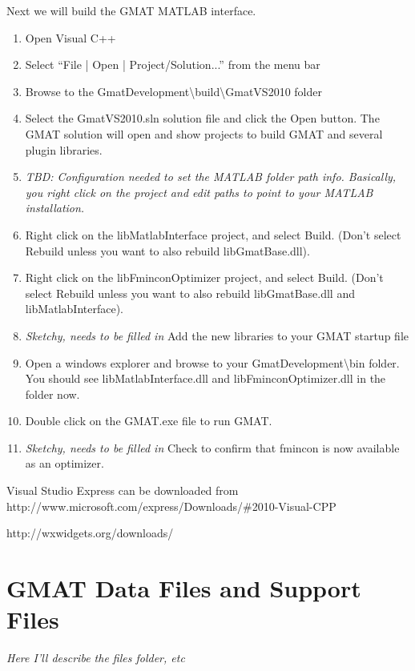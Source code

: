 \documentclass[letterpaper,10pt]{article}%
\begin{document}
Next we will build the GMAT MATLAB interface.

\begin{enumerate}
\item Open Visual C++
\item Select ``File | Open | Project/Solution...'' from the menu bar
\item Browse to the GmatDevelopment\textbackslash build\textbackslash GmatVS2010 folder
\item Select the GmatVS2010.sln solution file and click the Open button.  The GMAT solution will open and show projects to build GMAT and several plugin libraries.
\item \textit{TBD: Configuration needed to set the MATLAB folder path info.  Basically, you right click on the project and edit paths to point to your MATLAB installation.}
\item Right click on the libMatlabInterface project, and select Build.  (Don't select Rebuild unless you want to also rebuild libGmatBase.dll).
\item Right click on the libFminconOptimizer project, and select Build.  (Don't select Rebuild unless you want to also rebuild libGmatBase.dll and libMatlabInterface).
\item \textit{Sketchy, needs to be filled in} Add the new libraries to your GMAT startup file
\item Open a windows explorer and browse to your GmatDevelopment\textbackslash bin folder.  You should see libMatlabInterface.dll and libFminconOptimizer.dll in the folder now.
\item Double click on the GMAT.exe file to run GMAT.
\item \textit{Sketchy, needs to be filled in} Check to confirm that fmincon is now available as an optimizer.
\end{enumerate}



\begin{thebibliography}{9}                                                                                               
 Visual Studio Express can be downloaded from http://www.microsoft.com/express/Downloads/\#2010-Visual-CPP

 http://wxwidgets.org/downloads/
\end{thebibliography}


\appendix

\section{GMAT Data Files and Support Files }

\textit{Here I'll describe the files folder, etc}
\end{document}

